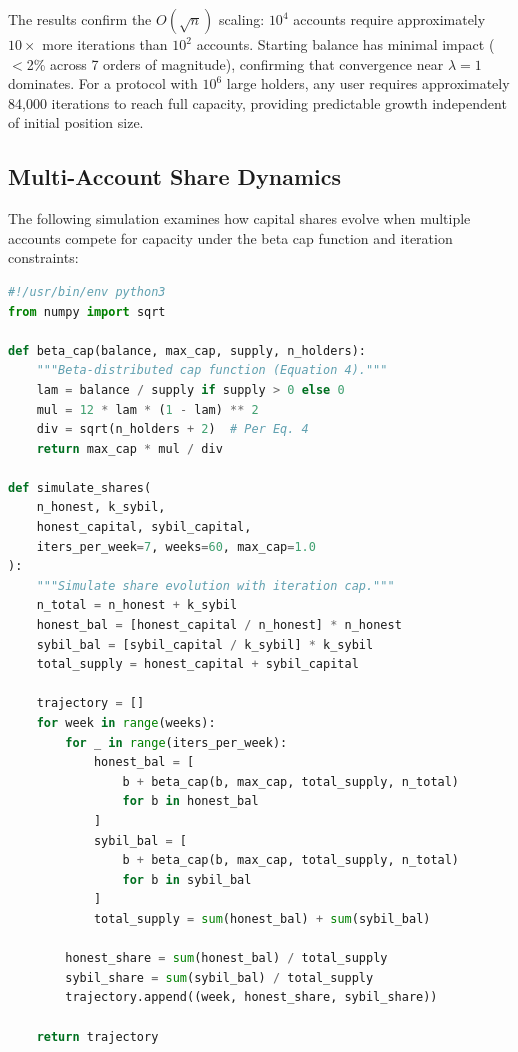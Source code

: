 \documentclass[10pt,a4paper,twocolumn]{article}
\theoremstyle{definition}
\theoremstyle{plain}
\theoremstyle{remark}
\begin{document}
The results confirm the $O(\sqrt{n})$ scaling: $10^4$ accounts require approximately $10\times$ more iterations than $10^2$ accounts. Starting balance has minimal impact ($<$2\% across 7 orders of magnitude), confirming that convergence near $\lambda = 1$ dominates. For a protocol with $10^6$ large holders, any user requires approximately 84,000 iterations to reach full capacity, providing predictable growth independent of initial position size.

\subsection{Multi-Account Share Dynamics}

The following simulation examines how capital shares evolve when multiple accounts compete for capacity under the beta cap function and iteration constraints:

\begin{lstlisting}[language=Python, caption={Multi-account share dynamics simulation}, label=lst:share-sim]
#!/usr/bin/env python3
from numpy import sqrt

def beta_cap(balance, max_cap, supply, n_holders):
    """Beta-distributed cap function (Equation 4)."""
    lam = balance / supply if supply > 0 else 0
    mul = 12 * lam * (1 - lam) ** 2
    div = sqrt(n_holders + 2)  # Per Eq. 4
    return max_cap * mul / div

def simulate_shares(
    n_honest, k_sybil,
    honest_capital, sybil_capital,
    iters_per_week=7, weeks=60, max_cap=1.0
):
    """Simulate share evolution with iteration cap."""
    n_total = n_honest + k_sybil
    honest_bal = [honest_capital / n_honest] * n_honest
    sybil_bal = [sybil_capital / k_sybil] * k_sybil
    total_supply = honest_capital + sybil_capital

    trajectory = []
    for week in range(weeks):
        for _ in range(iters_per_week):
            honest_bal = [
                b + beta_cap(b, max_cap, total_supply, n_total)
                for b in honest_bal
            ]
            sybil_bal = [
                b + beta_cap(b, max_cap, total_supply, n_total)
                for b in sybil_bal
            ]
            total_supply = sum(honest_bal) + sum(sybil_bal)

        honest_share = sum(honest_bal) / total_supply
        sybil_share = sum(sybil_bal) / total_supply
        trajectory.append((week, honest_share, sybil_share))

    return trajectory
\end{lstlisting}
\end{document}
